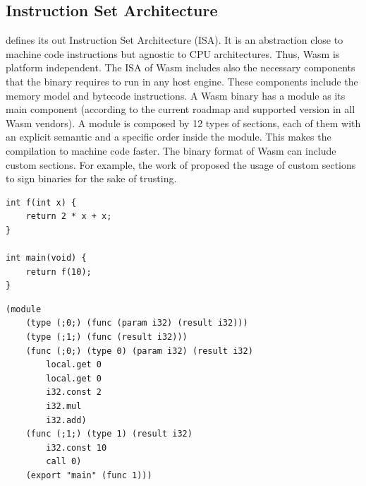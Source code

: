 





\subsection*{Instruction Set Architecture}

\wasm defines its out Instruction Set Architecture (ISA). It is an abstraction close to machine code instructions but agnostic to CPU architectures. Thus, Wasm is platform independent. The ISA of Wasm includes also the necessary components that the binary requires to run in any host engine. These components include the memory model and bytecode instructions.
A Wasm binary has a module as its main component (according to the current roadmap and supported version in all Wasm vendors). A module is composed by 12  types of sections, each of them with an explicit semantic and a specific order inside the module. This makes the compilation to machine code faster. The binary format of Wasm can include custom sections. For example, the work of  proposed the usage of custom sections to sign binaries for the sake of trusting.

\begin{code}
\begin{lstlisting}[style=CStyle]
int f(int x) { 
    return 2 * x + x; 
}

int main(void) { 
    return f(10); 
}
\end{lstlisting}
    

\begin{lstlisting}
(module
    (type (;0;) (func (param i32) (result i32)))
    (type (;1;) (func (result i32)))
    (func (;0;) (type 0) (param i32) (result i32)
        local.get 0
        local.get 0
        i32.const 2
        i32.mul
        i32.add)
    (func (;1;) (type 1) (result i32)
        i32.const 10
        call 0)
    (export "main" (func 1)))
\end{lstlisting}
\end{code}


